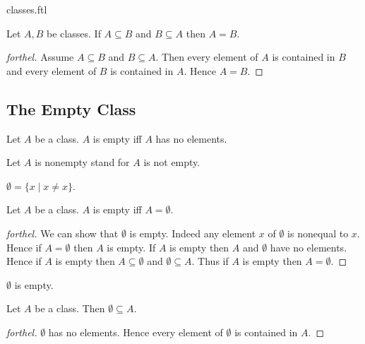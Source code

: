 \documentclass{naproche-library}
\begin{document}
\begin{smodule}{classes.ftl}
  \begin{proposition}[forthel,id=FOUNDATIONS_01_7159957847801856]
    Let $A, B$ be classes.
    If $A \subseteq B$ and $B \subseteq A$ then $A = B$.
  \end{proposition}
  \begin{proof}[forthel]
    Assume $A \subseteq B$ and $B \subseteq A$.
    Then every element of $A$ is contained in $B$ and every element of $B$ is contained in $A$.
    Hence $A = B$.
  \end{proof}


  \subsection*{The Empty Class}

  \begin{definition}[forthel,id=FOUNDATIONS_01_6252477624090624]
    Let $A$ be a class.
    $A$ is empty iff $A$ has no elements.

    Let $A$ is nonempty stand for $A$ is not empty.
  \end{definition}

  \begin{definition}[forthel,id=FOUNDATIONS_01_7939928493129728]
    $\emptyset = \{ x \mid x \neq x \}$.
  \end{definition}

  \begin{proposition}[forthel,id=FOUNDATIONS_01_2263153161273344]
    Let $A$ be a class.
    $A$ is empty iff $A = \emptyset$.
  \end{proposition}
  \begin{proof}[forthel]
    We can show that $\emptyset$ is empty.
    Indeed any element $x$ of $\emptyset$ is nonequal to $x$.
    Hence if $A = \emptyset$ then $A$ is empty.
    If $A$ is empty then $A$ and $\emptyset$ have no elements.
    Hence if $A$ is empty then $A \subseteq \emptyset$ and $\emptyset \subseteq A$.
    Thus if $A$ is empty then $A = \emptyset$.
  \end{proof}

  \begin{corollary}[forthel,id=FOUNDATIONS_01_1495141426659328]
    $\emptyset$ is empty.
  \end{corollary}

  \begin{corollary}[forthel,id=FOUNDATIONS_01_6931785090859008]
    Let $A$ be a class.
    Then $\emptyset \subseteq A$.
  \end{corollary}
  \begin{proof}[forthel]
    $\emptyset$ has no elements.
    Hence every element of $\emptyset$ is contained in $A$.
  \end{proof}



\end{smodule}
\end{document}
